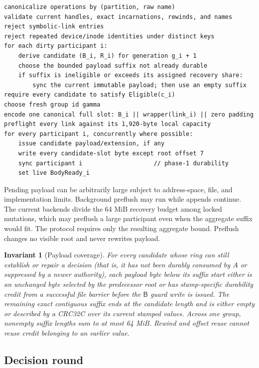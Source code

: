 \documentclass[10pt,twocolumn]{article}
\newtheorem{invariant}{Invariant}
\theoremstyle{remark}
\newcommand{\Prepared}{\mathsf{B}}
\begin{document}
\begin{lstlisting}[style=protocol,caption={Prepare one group $G$.}]
canonicalize operations by (partition, raw name)
validate current handles, exact incarnations, rewinds, and names
reject symbolic-link entries
reject repeated device/inode identities under distinct keys
for each dirty participant i:
    derive candidate (B_i, R_i) for generation g_i + 1
    choose the bounded payload suffix not already durable
    if suffix is ineligible or exceeds its assigned recovery share:
        sync the current immutable payload; then use an empty suffix
require every candidate to satisfy Eligible(c_i)
choose fresh group id gamma
encode one canonical full slot: B_i || wrapper(link_i) || zero padding
preflight every link against its 1,920-byte local capacity
for every participant i, concurrently where possible:
    issue candidate payload/extension, if any
    write every candidate-slot byte except root offset 7
    sync participant i                    // phase-1 durability
    set live BodyReady_i
\end{lstlisting}

Pending payload can be arbitrarily large subject to address-space, file, and implementation
limits. Background preflush may run while appends continue. The current backends divide the
64 MiB recovery budget among locked mutations, which may preflush a large participant even when the
aggregate suffix would fit. The protocol requires only the resulting aggregate bound. Preflush
changes no visible root and never rewrites payload.

\begin{invariant}[Payload coverage]\label{i:payload}
For every candidate whose ring can still establish or repair a decision (that is, it has not been
durably consumed by $A$ or suppressed by a newer authority), each payload byte below its suffix start either
is an unchanged byte selected
by the predecessor root or has stamp-specific durability credit from a successful file barrier
before the $\Prepared$ guard write is issued. The remaining exact contiguous suffix ends at the
candidate length and is either empty or described by a CRC32C over its current stamped values.
Across one group, nonempty suffix lengths sum to at most 64 MiB. Rewind and offset reuse cannot
reuse credit belonging to an earlier value.
\end{invariant}

\subsection{Decision round}
\end{document}
